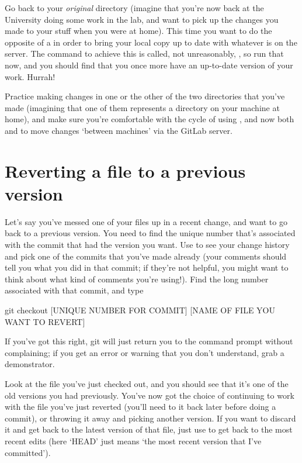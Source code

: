 Go back to your \emph{original}  directory (imagine that you're now back at the University doing some work in the lab, and want to pick up the changes you made to your stuff when you were at home). This time you want to do the opposite of a  in order to bring your local copy up to date with whatever is on the server. The command to achieve this is called, not unreasonably, , so run that now, and you should find that you once more have an up-to-date version of your work. Hurrah!

Practice making changes in one or the other of the two  directories that you've made (imagining that one of them represents a directory on your machine at home), and make sure you're comfortable with the cycle of using ,  and now both  and  to move changes `between machines' via the GitLab server.

\section{Reverting a file to a previous version}

Let's say you've messed one of your files up in a recent change, and want to go back to a previous version. You need to find the unique number that's associated with the commit that had the version you want. Use  to see your change history and pick one of the commits that you've made already (your comments should tell you what you did in that commit; if they're not helpful, you might want to think about what kind of comments you're using!). Find the long number associated with that commit, and type

\begin{ttoutenv}
git checkout [UNIQUE NUMBER FOR COMMIT] [NAME OF FILE YOU WANT TO REVERT]
\end{ttoutenv}

If you've got this right, git will just return you to the command prompt without complaining; if you get an error or warning that you don't understand, grab a demonstrator. 

Look at the file you've just checked out, and you should see that it's one of the old versions you had previously. You've now got the choice of continuing to work with the file you've just reverted (you'll need to  it back later before doing a commit), or throwing it away and picking another version. If you want to discard it and get back to the latest version of that file, just use  to get back to the most recent edits (here `HEAD' just means `the most recent version that I've committed').


